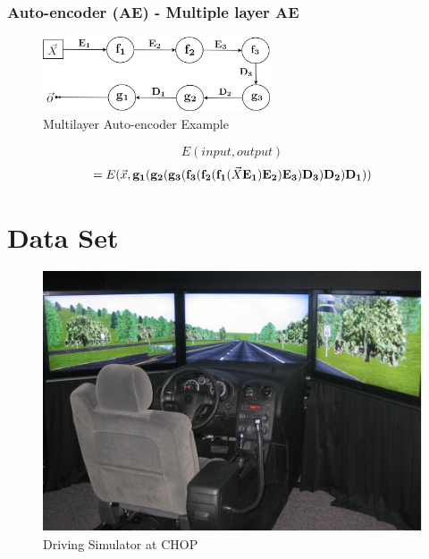 \documentclass{beamer}
\begin{document}
\begin{frame}
\frametitle{Auto-encoder (AE) - Multiple layer AE}
\begin{figure}[t!]
    \centering
    \includegraphics[width=0.6\textwidth]{../paper/pictures/figures/example_MAE.png}
    \caption{Multilayer Auto-encoder Example}
    \label{fig:example_MAE}
\end{figure}

$$E(input, output)$$
$$=E(\vec{x}, \bold{g_1}(\bold{g_2}(\bold{g_3}(\bold{f_3}(\bold{f_2}(\bold{f_1}(\vec{X}\bold{E_1})\bold{E_2})\bold{E_3})\bold{D_3})\bold{D_2})\bold{D_1}))$$
\end{frame}


\section{Data Set}
\begin{frame}
\begin{figure}[t!]
    \centering
    \includegraphics[width=\textwidth]{./pictures/figures/figure-simulator-cropped.pdf}
    \caption{Driving Simulator at CHOP}
    \label{fig:simulator}
\end{figure}
\end{frame}
\end{document}
